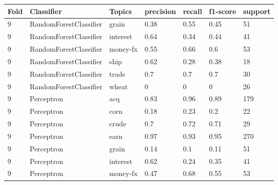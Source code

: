 \documentclass{article}
\begin{document}
\begin{table}[h]
\begin{tabular}{lllllll}
\textbf{Fold} & \textbf{Classifier}    & \textbf{Topics} & \textbf{precision} & \textbf{recall} & \textbf{f1-score} & \textbf{support} \\ \hline
9             & RandomForestClassifier & grain           & 0.38               & 0.55            & 0.45              & 51               \\
9             & RandomForestClassifier & interest        & 0.64               & 0.34            & 0.44              & 41               \\
9             & RandomForestClassifier & money-fx        & 0.55               & 0.66            & 0.6               & 53               \\
9             & RandomForestClassifier & ship            & 0.62               & 0.28            & 0.38              & 18               \\
9             & RandomForestClassifier & trade           & 0.7                & 0.7             & 0.7               & 30               \\
9             & RandomForestClassifier & wheat           & 0                  & 0               & 0                 & 26               \\
9             & Perceptron             & acq             & 0.83               & 0.96            & 0.89              & 179              \\
9             & Perceptron             & corn            & 0.18               & 0.23            & 0.2               & 22               \\
9             & Perceptron             & crude           & 0.7                & 0.72            & 0.71              & 29               \\
9             & Perceptron             & earn            & 0.97               & 0.93            & 0.95              & 270              \\
9             & Perceptron             & grain           & 0.14               & 0.1             & 0.11              & 51               \\
9             & Perceptron             & interest        & 0.62               & 0.24            & 0.35              & 41               \\
9             & Perceptron             & money-fx        & 0.47               & 0.68            & 0.55              & 53               \\

\end{tabular}
\end{table}
\end{document}
